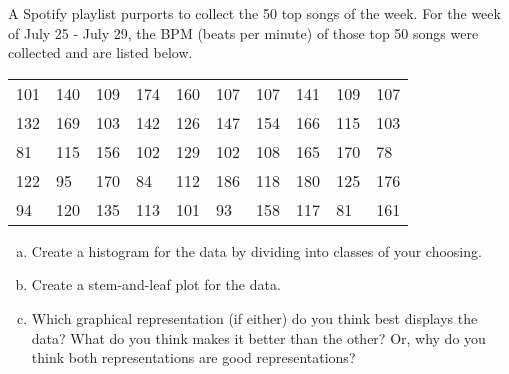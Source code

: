\documentclass[notes]{subfiles}
\begin{document}
		\begin{ex}
			A Spotify playlist purports to collect the 50 top songs of the week.  For the week of July 25 - July 29, the BPM (beats per minute) of those top 50 songs were collected and are listed below.
			\begin{center}
				\begin{tabular}{llllllllll}
					101&140&109&174&160&107&107&141&109&107\\
					132&169&103&142&126&147&154&166&115&103\\
					81&115&156&102&129&102&108&165&170&78\\
					122&95&170&84&112&186&118&180&125&176\\
					94&120&135&113&101&93&158&117&81&161
				\end{tabular}
			\end{center}
			\begin{enumerate}[(a)]
				\item Create a histogram for the data by dividing into classes of your choosing.%
					\newpage

				\item Create a stem-and-leaf plot for the data.%

				\item Which graphical representation (if either) do you think best displays the data?  What do you think makes it better than the other? Or, why do you think both representations are good representations?%

			\end{enumerate}
		\end{ex}
\clearpage
\end{document}
